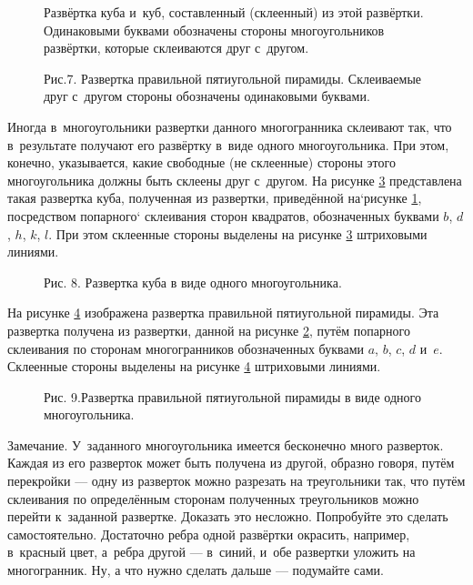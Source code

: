 \begin{figure}\label{fig:8_1_6}
\caption{Развёртка куба и~куб, составленный (склеенный) из этой развёртки.
Одинаковыми буквами обозначены стороны многоугольников развёртки, которые
склеиваются друг с~другом.}
\end{figure}


\begin{figure}\label{fig:8_1_7}
\caption{Рис.7. Развертка правильной пятиугольной пирамиды. Склеиваемые друг
с~другом стороны обозначены одинаковыми буквами.}
\end{figure}

Иногда в~многоугольники развертки данного многогранника склеивают так, что
в~результате получают его  развёртку в~виде одного многоугольника. При этом,
конечно, указывается, какие свободные (не склеенные) стороны этого многоугольника
должны быть склеены друг с~другом. На рисунке \ref{fig:8_1_8} представлена
такая развертка куба, полученная из развертки, приведённой на`рисунке \ref{fig:8_1_6},
посредством попарного` склеивания сторон квадратов, обозначенных буквами
$b$, $d$, $h$, $k$, $l$. При этом склеенные стороны выделены на рисунке
\ref{fig:8_1_8} штриховыми линиями.

\begin{figure}\label{fig:8_1_8}
\caption{Рис. 8. Развертка куба в виде одного многоугольника.}
\end{figure}


На рисунке \ref{fig:8_1_9} изображена развертка правильной пятиугольной пирамиды.
Эта развертка получена из развертки, данной на рисунке \ref{fig:8_1_7},
путём попарного склеивания по сторонам многогранников обозначенных буквами
$a$, $b$, $c$, $d$ и~$e$. Склеенные стороны выделены на рисунке \ref{fig:8_1_9}
штриховыми линиями.

\begin{figure}\label{fig:8_1_9}
\caption{Рис. 9.Развертка правильной пятиугольной пирамиды в виде одного
многоугольника.}
\end{figure}

\begin{note}
Замечание. У~заданного многоугольника имеется бесконечно много разверток.
Каждая из его разверток может быть получена из другой, образно говоря, путём
перекройки --- одну из разверток можно разрезать на треугольники так, что путём
склеивания по определённым сторонам полученных треугольников можно перейти
к~заданной развертке. Доказать это несложно. Попробуйте это сделать самостоятельно.
Достаточно ребра одной развёртки окрасить, например, в~красный цвет, а~ребра
другой --- в~синий, и~обе развертки уложить на многогранник.
Ну, а что нужно сделать дальше --- подумайте сами.
\end{note}
